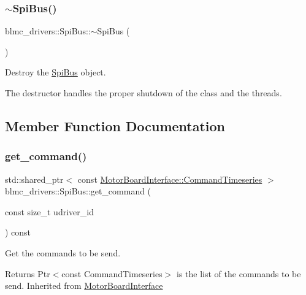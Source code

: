 \subsubsection{\texorpdfstring{$\sim$\+Spi\+Bus()}{~SpiBus()}}
{\footnotesize\ttfamily blmc\+\_\+drivers\+::\+Spi\+Bus\+::$\sim$\+Spi\+Bus (\begin{DoxyParamCaption}{ }\end{DoxyParamCaption})}



Destroy the \hyperlink{classblmc__drivers_1_1SpiBus}{Spi\+Bus} object. 

The destructor handles the proper shutdown of the class and the threads. 

\subsection{Member Function Documentation}
\mbox{\label{classblmc__drivers_1_1SpiBus_a70f133d24ab7de8efcea007eb73d78a1}} 
\subsubsection{\texorpdfstring{get\+\_\+command()}{get\_command()}}
{\footnotesize\ttfamily std\+::shared\+\_\+ptr$<$ const \hyperlink{classblmc__drivers_1_1MotorBoardInterface_ae2afe94a023d9f08a4c689e9b7660f15}{Motor\+Board\+Interface\+::\+Command\+Timeseries} $>$ blmc\+\_\+drivers\+::\+Spi\+Bus\+::get\+\_\+command (\begin{DoxyParamCaption}\item[{const size\+\_\+t}]{udriver\+\_\+id }\end{DoxyParamCaption}) const\hspace{0.3cm}{\ttfamily [virtual]}}



Get the commands to be send. 

\begin{DoxyReturn}{Returns}
Ptr$<$const Command\+Timeseries$>$ is the list of the commands to be send. Inherited from \hyperlink{classblmc__drivers_1_1MotorBoardInterface}{Motor\+Board\+Interface} 
\end{DoxyReturn}
\mbox{\label{classblmc__drivers_1_1SpiBus_a06300c7a9b8266966e281c8437a75a1b}} 
